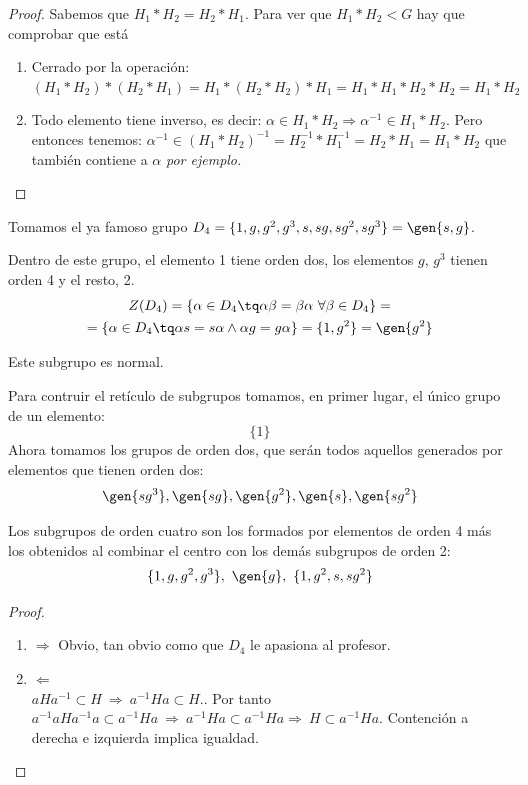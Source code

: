 \documentclass[nochap]{apuntes}
\begin{document}
 \begin{proof}
  Sabemos que $H_{1}\ast H_{2}=H_{2}\ast H_{1}$. Para ver que $H_{1}\ast H_{2}<G$  hay que comprobar que está
  \begin{enumerate}
   \item Cerrado por la operación: $(H_{1}\ast H_{2})\ast (H_{2}\ast H_{1})=H_{1}\ast (H_{2}\ast H_{2})\ast H_{1}=H_{1}\ast H_{1}\ast H_{2}\ast H_{2}=H_{1}\ast H_{2}$
   \item Todo elemento tiene inverso, es decir: $\alpha\in H_{1}\ast H_{2}\Rightarrow \alpha^{-1}\in H_{1}\ast H_{2}$. Pero entonces tenemos:
   $\alpha^{-1}\in (H_{1}\ast H_{2})^{-1} = H_{2}^{-1}\ast H_{1}^{-1}=H_{2}\ast H_{1}=H_{1}\ast H_{2}$ que también contiene a $\alpha$ \textit{por ejemplo.}
  \end{enumerate}

 \end{proof}

 \begin{example}
  Tomamos el ya famoso grupo $D_{4}=\{1,g,g^{2},g^{3}, s, sg, sg^{2}, sg^{3}\}=\gen{s,g}$.
  
  Dentro de este grupo, el elemento 1 tiene orden dos, los elementos $g$, $g^{3}$  tienen orden 4 y el resto, 2.
  \begin{gather*}
  Z(D_{4})= \{\alpha\in D_{4} \tq \alpha\beta=\beta\alpha \ \forall \beta \in D_{4}\}= \\
  = \{\alpha\in D_{4}\tq \alpha s = s\alpha \wedge \alpha g = g\alpha\}=\{1, g^{2}\}=\gen{g^{2}}
  \end{gather*} 
  
  Este subgrupo es normal.
  
  Para contruir el retículo de subgrupos tomamos, en primer lugar, el único grupo de un elemento: 
  \[ \{1\} \]
  Ahora tomamos los grupos de orden dos, que serán todos aquellos generados por elementos que tienen orden dos:\\
  \[ \gen{sg^{3}}, \gen{sg}, \gen{g^{2}}, \gen{s}, \gen{sg^{2}} \]
  
  Los subgrupos de orden cuatro son los formados por elementos de orden 4 más los obtenidos al combinar el centro con los demás subgrupos de orden 2:
  \[ \{1,g,g^{2},g^{3}\}, \ \gen{g}, \ \{1, g^{2}, s, sg^{2}\} \]
 \end{example}
 

 \begin{proof}
 \begin{enumerate}
  \item $\Rightarrow$  Obvio, tan obvio como que $D_4$ le apasiona al profesor.
  \item $\Leftarrow$\\
  $aHa^{-1} \subset H \ \Rightarrow \ a^{-1}Ha\subset H.$. Por tanto $a^{-1}aHa^{-1}a \subset a^{-1}Ha \ \Rightarrow \ a^{-1}Ha \subset  a^{-1}Ha \Rightarrow \ H \subset a^{-1}Ha$.
  Contención a derecha e izquierda implica igualdad.
 \end{enumerate}
 \end{proof} 
 
\end{document}
